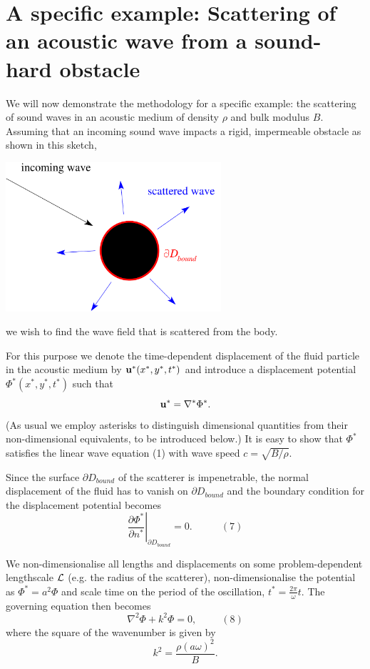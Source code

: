  

\hypertarget{index_scattering}{}\section{A specific example\+: Scattering of an acoustic wave from a sound-\/hard obstacle}\label{index_scattering}
We will now demonstrate the methodology for a specific example\+: the scattering of sound waves in an acoustic medium of density $ \rho $ and bulk modulus $ B $. Assuming that an incoming sound wave impacts a rigid, impermeable obstacle as shown in this sketch,

 
\begin{DoxyImage}
\includegraphics[width=0.6\textwidth]{scattering}
\end{DoxyImage}


we wish to find the wave field that is scattered from the body.

For this purpose we denote the time-\/dependent displacement of the fluid particle in the acoustic medium by $ {\bf u}^*(x^*,y^*,t^*) $ and introduce a displacement potential $ \Phi^*(x^*,y^*,t^*) $ such that \[ {\bf u}^* = \nabla^* \Phi^*. \] (As usual we employ asterisks to distinguish dimensional quantities from their non-\/dimensional equivalents, to be introduced below.) It is easy to show that $ \Phi^* $ satisfies the linear wave equation (1) with wave speed $ c = \sqrt{B/\rho}$.

Since the surface $ \partial D_{bound}$ of the scatterer is impenetrable, the normal displacement of the fluid has to vanish on $ \partial D_{bound}$ and the boundary condition for the displacement potential becomes \[ \left. \frac{\partial \Phi^*}{\partial n^*}\right|_{\partial D_{bound}} = 0. \ \ \ \ \ \ \ \ \ \ \ \ \ (7) \]

We non-\/dimensionalise all lengths and displacements on some problem-\/dependent lengthscale $ {\cal L}$ (e.\+g. the radius of the scatterer), non-\/dimensionalise the potential as $ \Phi^* = a^2 \Phi $ and scale time on the period of the oscillation, $ t^* = \frac{2\pi}{\omega} t.$ The governing equation then becomes \[ \nabla^2 \Phi + k^2 \Phi = 0, \ \ \ \ \ \ \ \ \ \ \ (8) \] where the square of the wavenumber is given by \[ k^2 = \frac{\rho (a\omega)^2}{B}. \]

